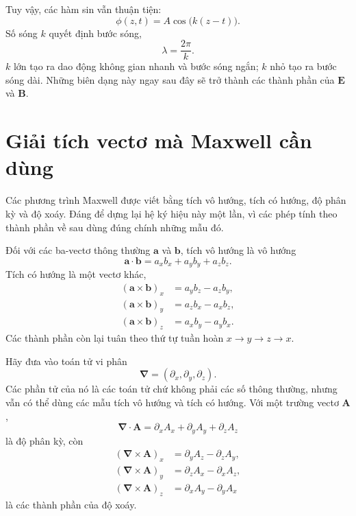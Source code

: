 Tuy vậy, các hàm sin vẫn thuận tiện:
\begin{equation}
\phi(z,t)=A\cos\!\bigl(k(z-t)\bigr).
\end{equation}
Số sóng \(k\) quyết định bước sóng,
\begin{equation}
\lambda=\frac{2\pi}{k}.
\end{equation}
\(k\) lớn tạo ra dao động không gian nhanh và bước sóng ngắn; \(k\) nhỏ tạo ra bước sóng dài. Những biên dạng này ngay sau đây sẽ trở thành các thành phần của \(\mathbf E\) và \(\mathbf B\).

\section{Giải tích vectơ mà Maxwell cần dùng}

Các phương trình Maxwell được viết bằng tích vô hướng, tích có hướng, độ phân kỳ và độ xoáy. Đáng để dựng lại hệ ký hiệu này một lần, vì các phép tính theo thành phần về sau dùng đúng chính những mẫu đó.

Đối với các ba-vectơ thông thường \(\mathbf a\) và \(\mathbf b\), tích vô hướng là vô hướng
\begin{equation}
\mathbf a\cdot\mathbf b
=a_xb_x+a_yb_y+a_zb_z.
\end{equation}
Tích có hướng là một vectơ khác,
\begin{align}
(\mathbf a\times\mathbf b)_x&=a_yb_z-a_zb_y,\\
(\mathbf a\times\mathbf b)_y&=a_zb_x-a_xb_z,\\
(\mathbf a\times\mathbf b)_z&=a_xb_y-a_yb_x.
\end{align}
Các thành phần còn lại tuân theo thứ tự tuần hoàn \(x\to y\to z\to x\).

Hãy đưa vào toán tử vi phân
\begin{equation}
\boldsymbol\nabla=
\left(\partial_x,\partial_y,\partial_z\right).
\end{equation}
Các phần tử của nó là các toán tử chứ không phải các số thông thường, nhưng vẫn có thể dùng các mẫu tích vô hướng và tích có hướng. Với một trường vectơ \(\mathbf A\),
\begin{equation}
\boldsymbol\nabla\cdot\mathbf A
=\partial_xA_x+\partial_yA_y+\partial_zA_z
\label{eq:divergence}
\end{equation}
là độ phân kỳ, còn
\begin{align}
(\boldsymbol\nabla\times\mathbf A)_x
 &=\partial_yA_z-\partial_zA_y,\\
(\boldsymbol\nabla\times\mathbf A)_y
 &=\partial_zA_x-\partial_xA_z,\\
(\boldsymbol\nabla\times\mathbf A)_z
 &=\partial_xA_y-\partial_yA_x
\label{eq:curl}
\end{align}
là các thành phần của độ xoáy.

